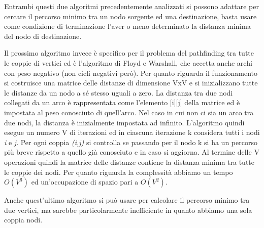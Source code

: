 \documentclass[12pt,a4paper]{report}
\begin{document}
Entrambi questi due algoritmi precedentemente analizzati si possono adattare per cercare il percorso minimo tra un nodo sorgente ed una destinazione, basta usare come condizione di terminazione l'aver o meno determinato la distanza minima del nodo di destinazione. 

\medskip

Il prossimo algoritmo invece è specifico per il problema del pathfinding tra tutte le coppie di vertici ed è l'algoritmo di Floyd e Warshall, che accetta anche archi con peso negativo (non cicli negativi però). 
Per quanto riguarda il funzionamento si costruisce una matrice delle distanze di dimensione VxV e si inizializzano tutte le distanze da un nodo a sé stesso uguali a zero.
La distanza tra due nodi collegati da un arco è rappresentata come l'elemento [i][j] della matrice ed è impostata al peso conosciuto di quell'arco. 
Nel caso in cui non ci sia un arco tra due nodi, la distanza è inizialmente impostata ad infinito. 
L'algoritmo quindi esegue un numero V di iterazioni ed in ciascuna iterazione k considera tutti i nodi \textit{i} e \textit{j}. 
Per ogni coppia \textit{(i,j)} si controlla se passando per il nodo k si ha un percorso più breve rispetto a quello già conosciuto e in caso si aggiorna.
Al termine delle V operazioni quindi la matrice delle distanze contiene la distanza minima tra tutte le coppie dei nodi.
Per quanto riguarda la complessità abbiamo un tempo \textbf{\textit{$O(V^3)$}} ed un'occupazione di spazio pari a \textbf{\textit{$O(V^2)$}}.

Anche quest'ultimo algoritmo si può usare per calcolare il percorso minimo tra due vertici, ma sarebbe particolarmente inefficiente in quanto abbiamo una sola coppia nodi.

\medskip
\end{document}
